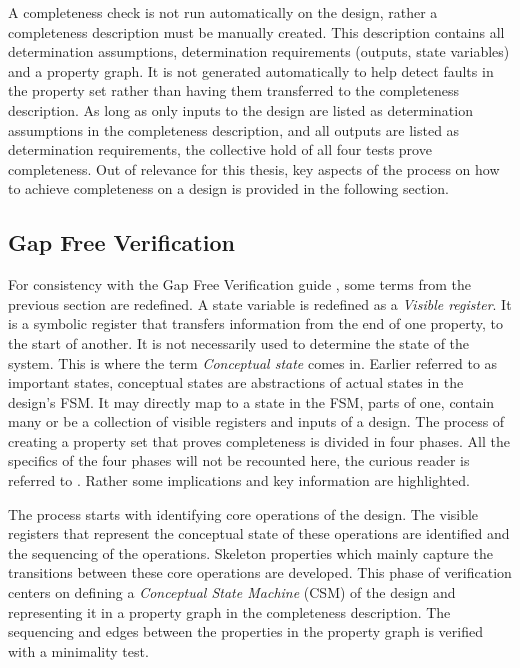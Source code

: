 A completeness check is not run automatically on the design, rather a completeness description must be manually created. This description contains all determination assumptions, determination requirements (outputs, state variables) and a property graph. It is not generated automatically to help detect faults in the property set rather than having them transferred to the completeness description. As long as only inputs to the design are listed as determination assumptions in the completeness description, and all outputs are listed as determination requirements, the collective hold of all four tests prove completeness. Out of relevance for this thesis, key aspects of the process on how to achieve completeness on a design is provided in the following section. 

\subsection{Gap Free Verification}
\label{sub:gfv}
For consistency with the Gap Free Verification guide \cite{gapfree}, some terms from the previous section are redefined. A state variable is redefined as a \textit{Visible register}. It is a symbolic register that transfers information from the end of one property, to the start of another. It is not necessarily used to determine the state of the system. This is where the term \textit{Conceptual state} comes in. Earlier referred to as important states, conceptual states are abstractions of actual states in the design's FSM. It may directly map to a state in the FSM, parts of one, contain many or be a collection of visible registers and inputs of a design. The process of creating a property set that proves completeness is divided in four phases. All the specifics of the four phases will not be recounted here, the curious reader is referred to \cite{gapfree}. Rather some implications and key information are highlighted. \par
The process starts with identifying core operations of the design. The visible registers that represent the conceptual state of these operations are identified and the sequencing of the operations. Skeleton properties which mainly capture the transitions between these core operations are developed. This phase of verification centers on defining a \textit{Conceptual State Machine} (CSM) of the design and representing it in a property graph in the completeness description. The sequencing and edges between the properties in the property graph is verified with a minimality test. \par
